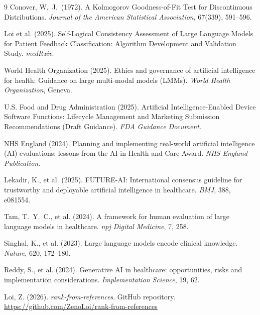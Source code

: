 \documentclass[12pt]{article}
\begin{document}
\begin{thebibliography}{9}
Conover, W.\ J.\ (1972). A Kolmogorov Goodness-of-Fit Test for Discontinuous Distributions. \textit{Journal of the American Statistical Association}, 67(339), 591--596.

Loi et al. (2025). Self-Logical Consistency Assessment of Large Language Models for Patient Feedback Classification: Algorithm Development and Validation Study. \textit{medRxiv}.

World Health Organization (2025). Ethics and governance of artificial intelligence for health: Guidance on large multi-modal models (LMMs). \textit{World Health Organization}, Geneva. 

U.S. Food and Drug Administration (2025). Artificial Intelligence-Enabled Device Software Functions: Lifecycle Management and Marketing Submission Recommendations (Draft Guidance). \textit{FDA Guidance Document}. 

NHS England (2024). Planning and implementing real-world artificial intelligence (AI) evaluations: lessons from the AI in Health and Care Award. \textit{NHS England Publication}. 

Lekadir, K., et al. (2025). FUTURE-AI: International consensus guideline for trustworthy and deployable artificial intelligence in healthcare. \textit{BMJ}, 388, e081554. 

Tam, T.\ Y.\ C., et al. (2024). A framework for human evaluation of large language models in healthcare. \textit{npj Digital Medicine}, 7, 258. 

Singhal, K., et al. (2023). Large language models encode clinical knowledge. \textit{Nature}, 620, 172--180. 

Reddy, S., et al. (2024). Generative AI in healthcare: opportunities, risks and implementation considerations. \textit{Implementation Science}, 19, 62.

Loi, Z. (2026). \textit{rank-from-references}. GitHub repository. \url{https://github.com/ZenoLoi/rank-from-references}




\end{thebibliography}
\end{document}
